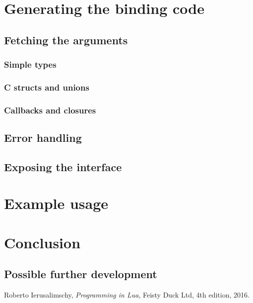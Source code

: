 \documentclass[polish, english]{iithesis}
\begin{document}
\chapter{Generating the binding code}
  \section{Fetching the arguments}
    \subsection{Simple types}
    \subsection{C structs and unions}
    \subsection{Callbacks and closures}
  \section{Error handling}
  \section{Exposing the interface}
\chapter{Example usage}
\chapter{Conclusion}
  \section{Possible further development}

\begin{thebibliography}{42}
    Roberto Ierusalimschy,
    \emph{Programming in Lua},
    Feisty Duck Ltd,
    4th edition,
    2016.
\end{thebibliography}
\end{document}
